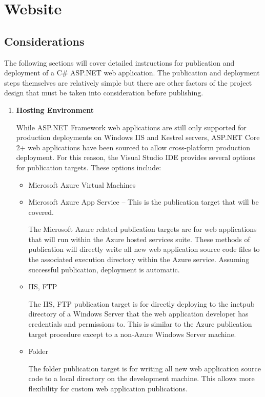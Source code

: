 
\section{Website}
\subsection{Considerations}

\tab The following sections will cover detailed instructions for publication and deployment of a C\# ASP.NET web application. The publication and deployment steps themselves are relatively simple but there are other factors of the project design that must be taken into consideration before publishing.  

\begin{enumerate}
    \item \textbf{Hosting Environment}

    \tab While ASP.NET Framework web applications are still only supported for production deployments on Windows IIS and Kestrel servers, ASP.NET Core 2+ web applications have been sourced to allow cross-platform production deployment. For this reason, the Visual Studio IDE provides several options for publication targets. These options include:

    \begin{itemize}
        \item Microsoft Azure Virtual Machines
        \item Microsoft Azure App Service -- This is the publication target that will be covered.
        
        \tab The Microsoft Azure related publication targets are for web applications that will run within the Azure hosted services suite. These methods of publication will directly write all new web application source code files to the associated execution directory within the Azure service.  Assuming successful publication, deployment is automatic.
        
        \item IIS, FTP
        
        \tab The IIS, FTP publication target is for directly deploying to the inetpub directory of a Windows Server that the web application developer has credentials and permissions to.  This is similar to the Azure publication target procedure except to a non-Azure Windows Server machine.
        
        \item Folder
        
        \tab The folder publication target is for writing all new web application source code to a local directory on the development machine. This allows more flexibility for custom web application publications.
    \end{itemize}
\end{enumerate}

